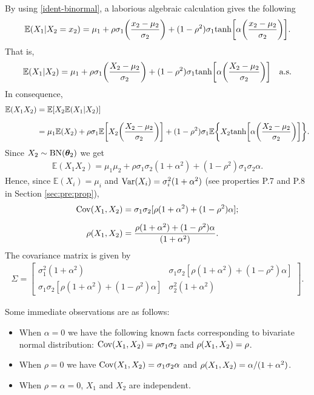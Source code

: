 \documentclass[12pt]{article}
\theoremstyle{definition}
\begin{document}
By using \eqref{ident-binormal}, a laborious algebraic calculation gives the following 
\begin{align*}
\mathbb{E}(X_1\vert X_2=x_2)
=
\mu_1
+
\rho \sigma_1 \biggl({ x_2-\mu_2\over \sigma_2}\biggr)
+
(1-\rho^2)\sigma_1
{\rm tanh}\biggl[\alpha\biggl({ x_2-\mu_2\over \sigma_2}\biggr)\biggr].
\end{align*}
That is, 
\begin{align*}
\mathbb{E}(X_1\vert X_2)
=
\mu_1
+
\rho \sigma_1 \biggl({ X_2-\mu_2\over \sigma_2}\biggr)
+
(1-\rho^2)\sigma_1
{\rm tanh}\biggl[\alpha\biggl({ X_2-\mu_2\over \sigma_2}\biggr)\biggr] \quad \text{a.s.}
\end{align*}
In consequence,
\begin{align*}
\mathbb{E}(X_1X_2)&=\mathbb{E}[X_2\mathbb{E}(X_1\vert X_2)]
\\[0,2cm]
&=
\mu_1\mathbb{E}(X_2)
+
\rho \sigma_1 \mathbb{E}\biggl[X_2\biggl({ X_2-\mu_2\over \sigma_2}\biggr)\biggr]
+
(1-\rho^2) \sigma_1
\mathbb{E}\biggl\{X_2
{\rm tanh}\biggl[\alpha\biggl({ X_2-\mu_2\over \sigma_2}\biggr)\biggr]
\biggr\}.
\end{align*}
Since $X_2\sim {\rm BN}(\boldsymbol{\theta}_2)$ we get
\begin{align*}
\mathbb{E}(X_1X_2)=
\mu_1\mu_2+\rho\sigma_1\sigma_2(1+\alpha^2)+(1-\rho^2)\sigma_1\sigma_2\alpha.
\end{align*}
Hence, since $\mathbb{E}(X_i)=\mu_i$ and ${\rm Var}(X_i)=\sigma^2_i(1+\alpha^2)$ (see properties P.7 and P.8 in Section \ref{sec:pre:prop}),
\begin{align}
{\rm Cov}(X_1,X_2)
&=
\sigma_1\sigma_2[
\rho(1+\alpha^2)+(1-\rho^2)\alpha]; \label{cov}
\\[0,2cm]
{\rm \rho}(X_1,X_2)&=
\dfrac{
	\rho(1+\alpha^2)+(1-\rho^2)\alpha}{(1+\alpha^2)}. \nonumber
\end{align}
The covariance matrix is given by
\begin{align*}
\Sigma=
\begin{bmatrix}
\sigma^2_1(1+\alpha^2) & \sigma_1\sigma_2[
\rho(1+\alpha^2)+(1-\rho^2)\alpha] \\[0,3cm]
\sigma_1\sigma_2[
\rho(1+\alpha^2)+(1-\rho^2)\alpha]   &  \sigma^2_2(1+\alpha^2) 
\end{bmatrix}.
\end{align*}

Some immediate observations are as follows:
\begin{itemize}
	\item
When $\alpha=0$ we have the following known facts corresponding to    bivariate normal distribution: ${\rm Cov}(X_1,X_2)=\rho\sigma_1\sigma_2$ and ${\rm \rho}(X_1,X_2)=\rho$.

	\item
When $\rho=0$ we have ${\rm Cov}(X_1,X_2)=\sigma_1\sigma_2\alpha$ and ${\rm \rho}(X_1,X_2)=\alpha/(1+\alpha^2)$.

	\item
When $\rho=\alpha=0$, $X_1$ and $X_2$ are independent.
\end{itemize}
\end{document}
